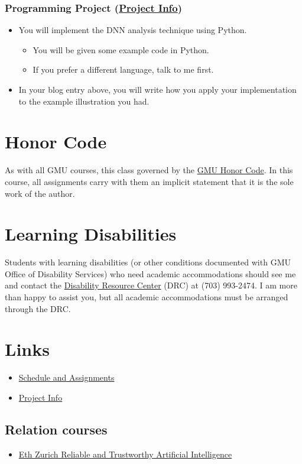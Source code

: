 \documentclass[11pt, a4paper]{article}
\begin{document}
\subsubsection*{Programming Project (\href{project.org}{Project Info})}
\label{sec:orgb697dba}
\begin{itemize}
\item You will implement the DNN analysis technique using Python.
\begin{itemize}
\item You will be given some example code in Python.
\item If you prefer a different language, talk to me first.
\end{itemize}
\item In your blog entry above, you will write  how you apply your implementation to the example illustration you had.
\end{itemize}


\section*{Honor Code}
\label{sec:orgf24f4c5}

As with all GMU courses, this class governed by the \href{http://oai.gmu.edu/the-mason-honor-code/}{GMU Honor Code}. In this course, all assignments carry with them an implicit statement that it is the sole work of the author.

\section*{Learning Disabilities}
\label{sec:org28deb33}

Students with learning disabilities (or other conditions documented with GMU Office of Disability Services) who need academic accommodations should see me and contact the \href{http://ods.gmu.edu/}{Disability Resource Center} (DRC) at (703) 993-2474. I am more than happy to assist you, but all academic accommodations must be arranged through the DRC.


\section*{Links}
\label{sec:org63a886d}
\begin{itemize}
\item \href{assignments.org}{Schedule and Assignments}
\item \href{project.org}{Project Info}
\end{itemize}

\subsection*{Relation courses}
\begin{itemize}
\item \href{https://www.sri.inf.ethz.ch/teaching/reliableai21}{Eth Zurich Reliable and Trustworthy Artificial  Intelligence}
\end{itemize}
\end{document}
